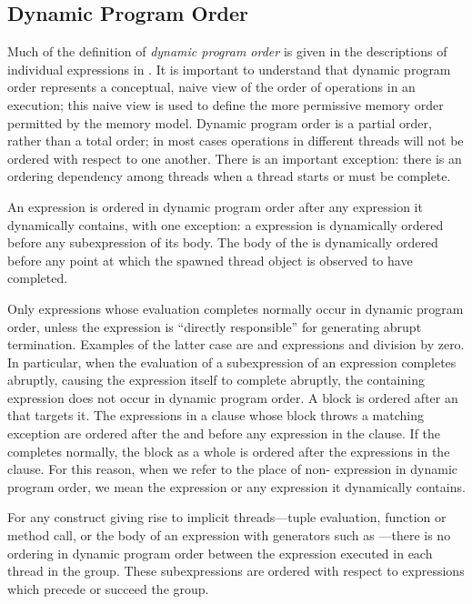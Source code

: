 \subsection{Dynamic Program Order}

Much of the definition of \emph{dynamic program order} is given in the
descriptions of individual expressions in .  It
is important to understand that dynamic program order represents a
conceptual, naive view of the order of operations in an execution;
this naive view is used to define the more permissive memory order
permitted by the memory model.  Dynamic program order is a partial
order, rather than a total order; in most cases operations in
different threads will not be ordered with respect to one another.
There is an important exception: there is an ordering dependency among
threads when a thread starts or must be complete.


An expression is ordered in dynamic program order after any expression
it dynamically contains, with one exception: a  expression
is dynamically ordered before any subexpression of its body.  The body
of the  is dynamically ordered before any point at which
the spawned thread object is observed to have completed.

Only expressions whose evaluation completes normally
occur in dynamic program order,
unless the expression is ``directly responsible'' for generating
abrupt termination.  Examples of the latter case are  and 
expressions and division by zero.  In particular, when
the evaluation of a
subexpression of an expression completes abruptly, causing the
expression itself to complete abruptly, the containing expression does
not occur in dynamic program order.
A  block is ordered
after an  that targets it.
The expressions in a 
clause whose  block throws a matching exception are ordered
after the  and before any expression in the 
clause.  If the  completes normally, the  block as
a whole is ordered after the expressions in the  clause.
For this reason, when we refer to the place of non-
expression in dynamic program order, we mean the expression or any
expression it dynamically contains.


For any construct giving rise to implicit threads---tuple
evaluation, function or method call, or the body of an expression with
generators such as ---there is no ordering in dynamic program
order between the expression executed in each thread in the group.
These subexpressions are ordered with respect to expressions which
precede or succeed the group.

